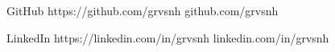 


\ProfileLink
    {GitHub}
    {https://github.com/grvsnh}
    {github.com/grvsnh}

\ProfileLink
    {LinkedIn}
    {https://linkedin.com/in/grvsnh}
    {linkedin.com/in/grvsnh}





